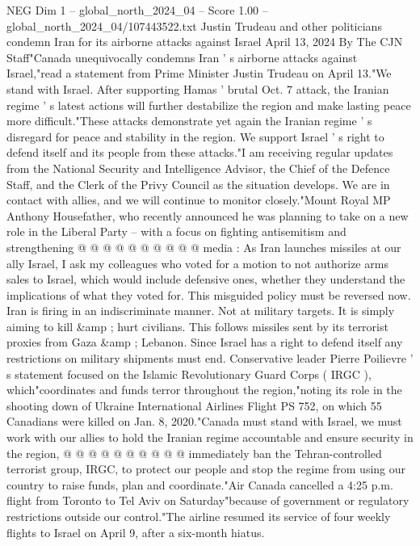\begin{textsample}{NEG Dim 1 – global\_north\_2024\_04 – Score 1.00 – global\_north\_2024\_04/107443522.txt}  \label{ex:f1_neg_256}
Justin Trudeau and other politicians condemn Iran for its airborne attacks against Israel April 13, 2024 By The CJN Staff"Canada unequivocally condemns Iran ' s airborne attacks against Israel,"read a statement from Prime Minister Justin Trudeau on April 13."We stand with Israel.
After supporting Hamas ' brutal Oct. 7 attack, the Iranian regime ' s latest actions will further destabilize the region and make lasting peace more difficult."These attacks demonstrate yet again the Iranian regime ' s disregard for peace and stability in the region.
We support Israel ' s right to defend itself and its people from these attacks."I am receiving regular updates from the National Security and Intelligence Advisor, the Chief of the Defence Staff, and the Clerk of the Privy Council as the situation develops.
We are in contact with allies, and we will continue to monitor closely."Mount Royal MP Anthony Housefather, who recently announced he was planning to take on a new role in the Liberal Party -- with a focus on fighting antisemitism and strengthening @ @ @ @ @ @ @ @ @ @ media : As Iran launches missiles at our ally Israel, I ask my colleagues who voted for a motion to not authorize arms sales to Israel, which would include defensive ones, whether they understand the implications of what they voted for.
This misguided policy must be reversed now.
Iran is firing in an indiscriminate manner.
Not at military targets.
It is simply aiming to kill \&amp ; hurt civilians.
This follows missiles sent by its terrorist proxies from Gaza \&amp ; Lebanon.
Since Israel has a right to defend itself any restrictions on military shipments must end.
Conservative leader Pierre Poilievre ' s statement focused on the Islamic Revolutionary Guard Corps ( IRGC ), which"coordinates and funds terror throughout the region,"noting its role in the shooting down of Ukraine International Airlines Flight PS 752, on which 55 Canadians were killed on Jan. 8, 2020."Canada must stand with Israel, we must work with our allies to hold the Iranian regime accountable and ensure security in the region, @ @ @ @ @ @ @ @ @ @ immediately ban the Tehran-controlled terrorist group, IRGC, to protect our people and stop the regime from using our country to raise funds, plan and coordinate."Air Canada cancelled a 4:25 p.m. flight from Toronto to Tel Aviv on Saturday"because of government or regulatory restrictions outside our control."The airline resumed its service of four weekly flights to Israel on April 9, after a six-month hiatus.

\end{textsample}
